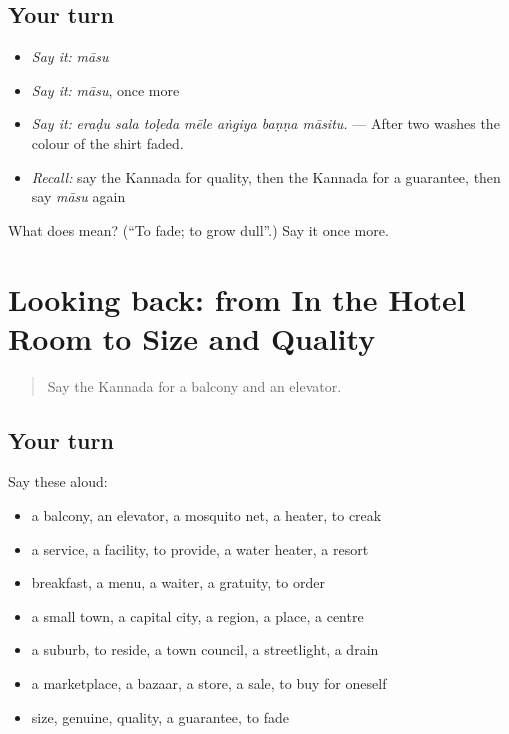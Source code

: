 \subsection*{Your turn}
\begin{itemize}
\raggedright
  \item \emph{Say it:} \emph{māsu}
  \item \emph{Say it:} \emph{māsu}, once more
  \item \emph{Say it:} \emph{eraḍu sala toḷeda mēle aṅgiya baṇṇa māsitu.} — After two washes the colour of the shirt faded.
  \item \emph{Recall:} say the Kannada for quality, then the Kannada for a guarantee, then say \emph{māsu} again
\end{itemize}

\begin{tcolorbox}[breakable,colback=teal!4,colframe=teal!35!black,title={Before you move on}]
What does  mean? (\textquotedblleft{}To fade; to grow dull\textquotedblright{}.) Say it once more.
\end{tcolorbox}
\section[(dialogue)]{Looking back: from In the Hotel Room to Size and Quality}

\label{lesson:KA-R468-review-462-468}



\begin{quote}
Say the Kannada for a balcony and an elevator.
\end{quote}

\subsection*{Your turn}
Say these aloud:

\begin{itemize}
\raggedright
  \item a balcony, an elevator, a mosquito net, a heater, to creak
  \item a service, a facility, to provide, a water heater, a resort
  \item breakfast, a menu, a waiter, a gratuity, to order
  \item a small town, a capital city, a region, a place, a centre
  \item a suburb, to reside, a town council, a streetlight, a drain
  \item a marketplace, a bazaar, a store, a sale, to buy for oneself
  \item size, genuine, quality, a guarantee, to fade
\end{itemize}

